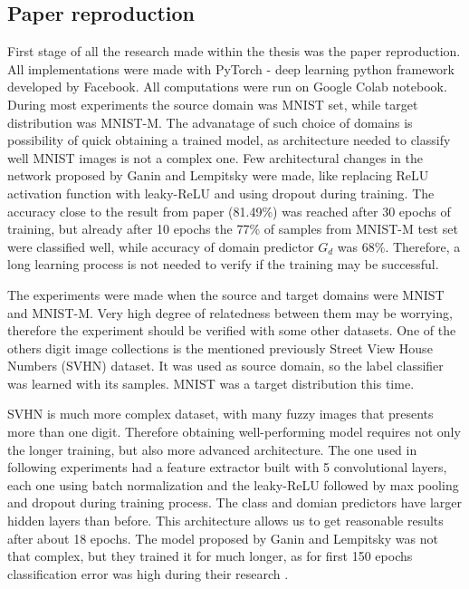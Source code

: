 \documentclass{article}
\begin{document}
\subsection{Paper reproduction}
First stage of all the research made within the thesis was the paper reproduction. All implementations were made with PyTorch \cite{pytorch} - deep learning python framework developed by Facebook. All computations were run on Google Colab \cite{colab} notebook. During most experiments the source domain was MNIST set, while target distribution was MNIST-M. The advanatage of such choice of domains is possibility of quick obtaining a trained model, as architecture needed to classify well MNIST images is not a complex one. Few architectural changes in the network proposed by Ganin and Lempitsky were made, like replacing ReLU activation function with leaky-ReLU \cite{leaky_relu} and using dropout \cite{dropout} during training. The accuracy close to the result from paper (81.49\%) was reached after 30 epochs of training, but already after 10 epochs the 77\% of samples from MNIST-M test set were classified well, while accuracy of domain predictor $G_{d}$ was 68\%. Therefore, a long learning process is not needed to verify if the training may be successful.
\par
The experiments were made when the source and target domains were MNIST and MNIST-M. Very high degree of relatedness between them may  be worrying, therefore the experiment should be verified with some other datasets. One of the others digit image collections is the mentioned previously Street View House Numbers (SVHN) dataset. It was used as source domain, so the label classifier was learned with its samples. MNIST was a target distribution this time.
\par
SVHN is much more complex dataset, with many fuzzy images that presents more than one digit. Therefore obtaining well-performing model requires not only the longer training, but also more advanced architecture. The one used in following experiments had a feature extractor built with 5 convolutional layers, each one using batch normalization \cite{batch_norm} and the leaky-ReLU followed by max pooling and dropout during training process. The class and domian predictors have larger hidden layers than before. This architecture allows us to get reasonable results after about 18 epochs. The model proposed by Ganin and Lempitsky was not that complex, but they trained it for much longer, as for first 150 epochs classification error was high during their research \cite{pmlr-v37-ganin15}.
\par
\end{document}
